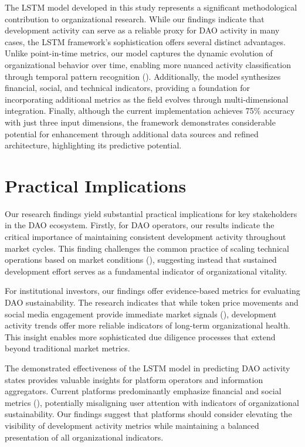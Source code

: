 The LSTM model developed in this study represents a significant methodological contribution to organizational research. While our findings indicate that development activity can serve as a reliable proxy for DAO activity in many cases, the LSTM framework's sophistication offers several distinct advantages. Unlike point-in-time metrics, our model captures the dynamic evolution of organizational behavior over time, enabling more nuanced activity classification through temporal pattern recognition (\cite{wang2003temporal}). Additionally, the model synthesizes financial, social, and technical indicators, providing a foundation for incorporating additional metrics as the field evolves through multi-dimensional integration. Finally, although the current implementation achieves 75\% accuracy with just three input dimensions, the framework demonstrates considerable potential for enhancement through additional data sources and refined architecture, highlighting its predictive potential.












\section{Practical Implications}

Our research findings yield substantial practical implications for key stakeholders in the DAO ecosystem. Firstly, for DAO operators, our results indicate the critical importance of maintaining consistent development activity throughout market cycles. This finding challenges the common practice of scaling technical operations based on market conditions (\cite{teece1997dynamic}), suggesting instead that sustained development effort serves as a fundamental indicator of organizational vitality. 

For institutional investors, our findings offer evidence-based metrics for evaluating DAO sustainability. The research indicates that while token price movements and social media engagement provide immediate market signals (\cite{chen2009approximability}), development activity trends offer more reliable indicators of long-term organizational health. This insight enables more sophisticated due diligence processes that extend beyond traditional market metrics.

The demonstrated effectiveness of the LSTM model in predicting DAO activity states provides valuable insights for platform operators and information aggregators. Current platforms predominantly emphasize financial and social metrics (\cite{deepDaoWebsite}), potentially misaligning user attention with indicators of organizational sustainability. Our findings suggest that platforms should consider elevating the visibility of development activity metrics while maintaining a balanced presentation of all organizational indicators.

